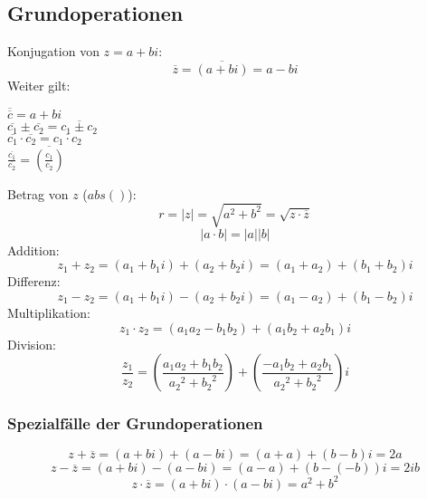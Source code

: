 \documentclass{report}
\begin{document}
\subsection{Grundoperationen}
Konjugation von $z = a + bi$:
\begin{equation}\overline {z} = \overline{(a + bi)} = a-bi\end{equation}
Weiter gilt:
\begin{center}$\overline{\overline{c}} = a + bi$\\
$\overline{c_1} \pm \overline{c_2} = \overline{c_1 \pm c_2}$\\
$\overline{c_1} \cdot \overline{c_2} = \overline{c_1 \cdot c_2}$\\
$\frac{\overline{c_1}}{\overline{c_2}} = \overline{(\frac{c_1}{c_2})}$\end{center}
Betrag von $z$ ($abs()$):
\begin{equation}r = |z| = \sqrt{a^2 + b^2} = \sqrt{z \cdot \overline{z}}\end{equation}
\begin{equation}|a \cdot b| = |a||b|\end{equation}
Addition:
\begin{equation}z_1 + z_2 = (a_1 + b_1 i) + (a_2 + b_2 i) = (a_1 + a_2) + (b_1 + b_2)i\end{equation}
Differenz:
\begin{equation}z_1 - z_2 = (a_1 + b_1 i) - (a_2 + b_2 i) = (a_1 - a_2) + (b_1 - b_2)i\end{equation}
Multiplikation:
\begin{equation}z_1 \cdot z_2 = (a_1a_2 - b_1b_2) + (a_1b_2 + a_2b_1)i\end{equation}
Division:
\begin{equation}\frac{z_1}{z_2} = (\frac{a_1a_2 + b_1b_2}{{a_2}^2+{b_2}^2}) + (\frac{-a_1b_2+a_2b_1}
{{a_2}^2+{b_2}^2})i\end{equation}
\subsubsection{Spezialfälle der Grundoperationen}
\begin{equation}z  + \overline{z} = (a + bi)+(a - bi) = (a + a)+ (b -b) i = 2a\end{equation}
\begin{equation}z  - \overline{z} = (a + bi) - (a - bi) = (a - a) + (b - (-b)) i = 2ib\end{equation}
\begin{equation}z  \cdot \overline{z} = (a + bi)\cdot(a-bi) = a^2 + b^2\end{equation}
\end{document}

